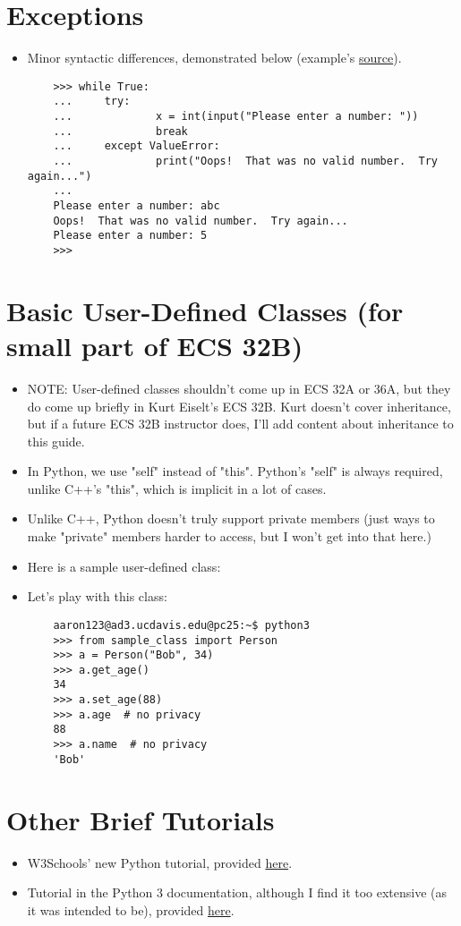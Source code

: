 \documentclass{article}
\begin{document}
\section{Exceptions}
\begin{itemize}
    \item Minor syntactic differences, demonstrated below (example's \href{https://docs.python.org/3/tutorial/errors.html}{source}).
    \begin{lstlisting}
    >>> while True:
    ...     try:
    ...             x = int(input("Please enter a number: "))
    ...             break
    ...     except ValueError:
    ...             print("Oops!  That was no valid number.  Try again...")
    ... 
    Please enter a number: abc
    Oops!  That was no valid number.  Try again...
    Please enter a number: 5
    >>> 
    \end{lstlisting}
\end{itemize}

\section{Basic User-Defined Classes (for small part of ECS 32B)}
\begin{itemize}
    \item NOTE: User-defined classes shouldn't come up in ECS 32A or 36A, but they do come up briefly in Kurt Eiselt's ECS 32B. Kurt doesn't cover inheritance, but if a future ECS 32B instructor does, I'll add content about inheritance to this guide.
    \item In Python, we use "self" instead of "this". Python's "self" is always required, unlike C++'s "this", which is implicit in a lot of cases.
    \item Unlike C++, Python doesn't truly support private members (just ways to make "private" members harder to access, but I won't get into that here.)
    \item Here is a sample user-defined class:
    
    \item Let's play with this class:
    \begin{lstlisting}
    aaron123@ad3.ucdavis.edu@pc25:~$ python3
    >>> from sample_class import Person
    >>> a = Person("Bob", 34)
    >>> a.get_age()
    34
    >>> a.set_age(88)
    >>> a.age  # no privacy
    88
    >>> a.name  # no privacy
    'Bob'
    \end{lstlisting}
\end{itemize}

\section{Other Brief Tutorials}
\begin{itemize}
    \item W3Schools' new Python tutorial, provided \href{https://www.w3schools.com/python/default.asp}{here}.
    \item Tutorial in the Python 3 documentation, although I find it too extensive (as it was intended to be), provided \href{https://docs.python.org/3/tutorial/}{here}.
\end{itemize}
\end{document}
